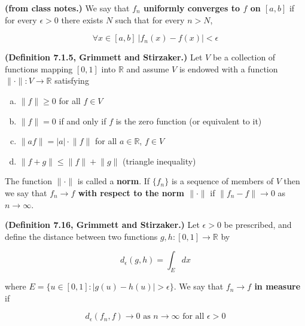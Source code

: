 \begin{definition} \textbf{(from class notes.)} We say that \textbf{ \(f_n\) \textbf{uniformly converges} to \(f\) on \([a, b]\)} if for every \(\epsilon > 0\) there exists \(N\) such that for every \(n > N\),

\[
\forall x \in [a, b] \ |f_n(x) - f(x)| < \epsilon
\]

\end{definition}

\begin{definition} \textbf{(Definition 7.1.5, Grimmett and Stirzaker.)} Let \(V\) be a collection of functions mapping \([0, 1]\) into \(\mathbb{R}\) and assume \(V\) is endowed with a function \(\lVert \cdot \rVert : V \to \mathbb{R}\) satisfying

\begin{enumerate}[(a)]

\item \(\lVert f \rVert \geq 0\) for all \(f \in V\)

\item \(\lVert f \rVert = 0\) if and only if \(f\) is the zero function (or equivalent to it)

\item \(\lVert af \rVert = |a| \cdot \lVert f \rVert \) for all \(a \in \mathbb{R}\), \(f \in V\)

\item \(\lVert f + g \rVert \leq \lVert f \rVert + \lVert g \rVert \) (triangle inequality)

\end{enumerate}

The function \(\lVert \cdot \rVert\) is called a \textbf{norm}. If \(\{f_n\}\) is a sequence of members of \(V\) then we say that \textbf{\(f_n \to f\) with respect to the norm \(\lVert \cdot \rVert\)} if \(\lVert f_n - f \rVert \to 0 \) as \(n \to \infty\).

\end{definition}

\begin{definition} \textbf{(Definition 7.16, Grimmett and Stirzaker.)} Let \(\epsilon > 0\) be prescribed, and define the distance between two functions \(g, h: [0, 1] \to \mathbb{R}\) by

\[
d_\epsilon(g,h) = \int_E dx
\]

where \(E = \{ u \in[0, 1] : |g(u) - h(u)| > \epsilon \}\). We say that \textbf{ \(f_n \to f\) in measure} if 

\[
d_\epsilon(f_n, f) \to 0 \text{ as } n \to \infty \text{ for all } \epsilon > 0
\]

\end{definition}

